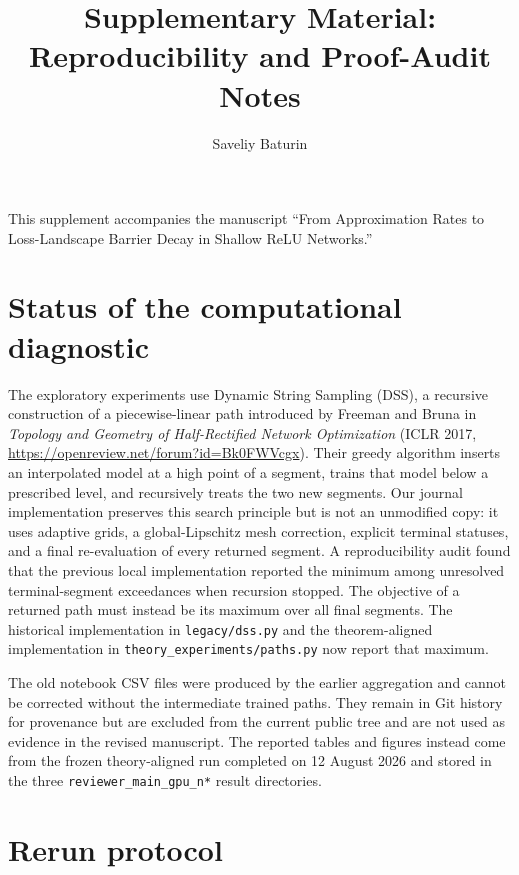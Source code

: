 \documentclass[11pt,a4paper]{article}
\title{Supplementary Material: Reproducibility and Proof-Audit Notes}
\author{Saveliy Baturin}
\date{}
\begin{document}
\maketitle

\noindent
This supplement accompanies the manuscript ``From Approximation Rates to Loss-Landscape Barrier Decay in Shallow ReLU Networks.''

\section*{Status of the computational diagnostic}

The exploratory experiments use Dynamic String Sampling (DSS), a recursive construction of a piecewise-linear path introduced by Freeman and Bruna in \emph{Topology and Geometry of Half-Rectified Network Optimization} (ICLR 2017, \url{https://openreview.net/forum?id=Bk0FWVcgx}). Their greedy algorithm inserts an interpolated model at a high point of a segment, trains that model below a prescribed level, and recursively treats the two new segments. Our journal implementation preserves this search principle but is not an unmodified copy: it uses adaptive grids, a global-Lipschitz mesh correction, explicit terminal statuses, and a final re-evaluation of every returned segment. A reproducibility audit found that the previous local implementation reported the minimum among unresolved terminal-segment exceedances when recursion stopped. The objective of a returned path must instead be its maximum over all final segments. The historical implementation in \texttt{legacy/dss.py} and the theorem-aligned implementation in \texttt{theory\_experiments/paths.py} now report that maximum.

The old notebook CSV files were produced by the earlier aggregation and cannot be corrected without the intermediate trained paths. They remain in Git history for provenance but are excluded from the current public tree and are not used as evidence in the revised manuscript. The reported tables and figures instead come from the frozen theory-aligned run completed on 12 August 2026 and stored in the three \texttt{reviewer\_main\_gpu\_n*} result directories.

\section*{Rerun protocol}
\end{document}

